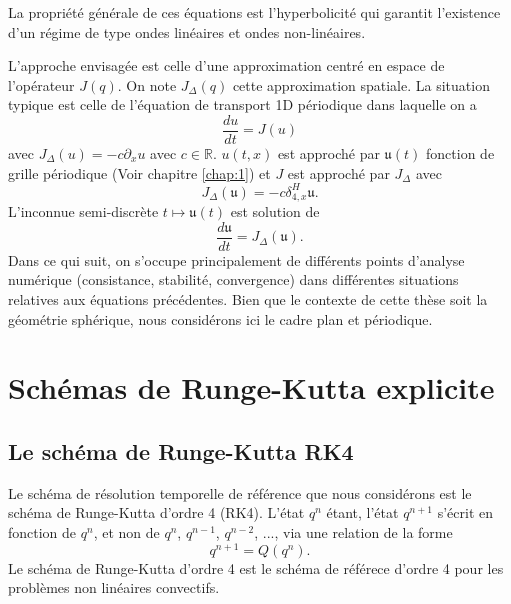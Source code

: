 La propriété générale de ces équations est l'hyperbolicité qui garantit l'existence d'un régime de type ondes linéaires et ondes non-linéaires.

L'approche envisagée est celle d'une approximation centré en espace de l'opérateur $J(q)$. On note $J_{\Delta}(q)$ cette approximation spatiale. La situation typique est celle de l'équation de transport 1D périodique dans laquelle on a
\begin{equation}
\dfrac{d u}{dt} = J (u)
\label{eq:edo}
\end{equation}
avec $J_{\Delta}(u) = - c \partial_x u$ avec $c \in \mathbb{R}$. $u(t,x)$ est approché par $\mathfrak{u}(t)$ fonction de grille périodique (Voir chapitre \ref{chap:1}) et $J$ est approché par $J_{\Delta}$ avec
\begin{equation}
J_{\Delta}(\mathfrak{u}) = - c \delta_{4,x}^H \mathfrak{u}.
\end{equation}
L'inconnue semi-discrète $t \mapsto \mathfrak{u}(t)$ est solution de 
\begin{equation}
\dfrac{d \mathfrak{u}}{dt} = J_{\Delta}(\mathfrak{u}).
\end{equation}
Dans ce qui suit, on s'occupe principalement de différents points d'analyse numérique (consistance, stabilité, convergence) dans différentes situations relatives aux équations précédentes. Bien que le contexte de cette thèse soit la géométrie sphérique, nous considérons ici le cadre plan et périodique.










\section{Schémas de Runge-Kutta explicite}

\subsection{Le schéma de Runge-Kutta RK4}

Le schéma de résolution temporelle de référence que nous considérons est le schéma de Runge-Kutta d'ordre 4 (RK4). L'état $q^n$ étant, l'état $q^{n+1}$ s'écrit en fonction de $q^n$, et non de $q^n$, $q^{n-1}$, $q^{n-2}$, ..., via une relation de la forme
\begin{equation}
q^{n+1} = Q(q^n).
\label{eq:recurrence_rk}
\end{equation}
Le schéma de Runge-Kutta d'ordre 4 est le schéma de référece d'ordre 4 pour les problèmes non linéaires convectifs. 

